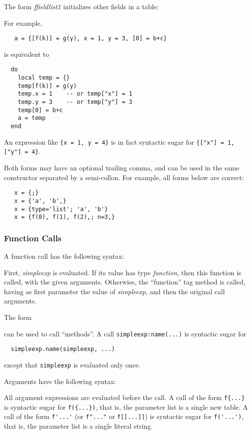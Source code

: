 \documentclass[11pt]{article}
\newcommand{\M}[1]{\emph{#1}}
\newcommand{\Index}[1]{#1\index{#1}}
\begin{document}
The form \emph{ffieldlist1} initializes other fields in a table:
\begin{Produc}
\end{Produc}%
For example,
\begin{verbatim}
   a = {[f(k)] = g(y), x = 1, y = 3, [0] = b+c}
\end{verbatim}
is equivalent to
\begin{verbatim}
  do
    local temp = {}
    temp[f(k)] = g(y)
    temp.x = 1    -- or temp["x"] = 1
    temp.y = 3    -- or temp["y"] = 3
    temp[0] = b+c
    a = temp
  end
\end{verbatim}
An expression like \verb|{x = 1, y = 4}| is
in fact syntactic sugar for \verb|{["x"] = 1, ["y"] = 4}|.

Both forms may have an optional trailing comma,
and can be used in the same constructor separated by
a semi-collon.
For example, all forms below are correct:
\begin{verbatim}
   x = {;}
   x = {'a', 'b',}
   x = {type='list'; 'a', 'b'}
   x = {f(0), f(1), f(2),; n=3,}
\end{verbatim}

\subsubsection{Function Calls}  \label{functioncall}
A \Index{function call} has the following syntax:
\begin{Produc}
\end{Produc}%
First, \M{simpleexp} is evaluated.
If its value has type \emph{function},
then this function is called,
with the given arguments.
Otherwise, the ``function'' tag method is called,
having as first parameter the value of \M{simpleexp},
and then the original call arguments.

The form
\begin{Produc}
\end{Produc}%
can be used to call ``methods''.
A call \verb|simpleexp:name(...)|
is syntactic sugar for
\begin{verbatim}
  simpleexp.name(simpleexp, ...)
\end{verbatim}
except that \verb|simpleexp| is evaluated only once.

Arguments have the following syntax:
\begin{Produc}
\end{Produc}%
All argument expressions are evaluated before the call.
A call of the form \verb|f{...}| is syntactic sugar for
\verb|f({...})|, that is,
the parameter list is a single new table.
A call of the form \verb|f'...'|
(or \verb|f"..."| or \verb|f[[...]]|) is syntactic sugar for
\verb|f('...')|, that is,
the parameter list is a single literal string.
\end{document}
